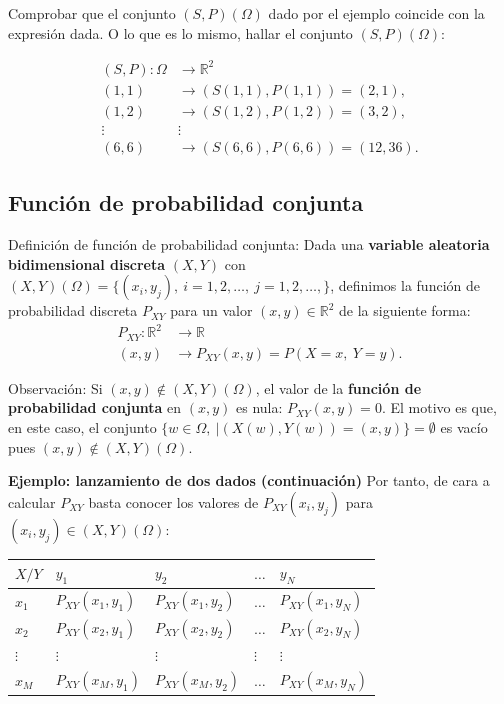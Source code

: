 \documentclass[]{book}
\begin{document}
Comprobar que el conjunto \((S,P)(\Omega)\) dado por el ejemplo coincide con la expresión dada.
O lo que es lo mismo, hallar el conjunto \((S,P)(\Omega)\):

\[
\begin{array}{rl}
(S,P): \Omega & \longrightarrow \mathbb{R}^2\\
(1,1) & \longrightarrow (S(1,1),P(1,1))=(2,1),\\
(1,2) & \longrightarrow (S(1,2),P(1,2))=(3,2),\\
\vdots & \vdots \\
(6,6) & \longrightarrow (S(6,6),P(6,6))=(12,36).
\end{array}
\]

\hypertarget{funciuxf3n-de-probabilidad-conjunta}{%
\subsection{Función de probabilidad conjunta}\label{funciuxf3n-de-probabilidad-conjunta}}

Definición de función de probabilidad conjunta:
Dada una \textbf{variable aleatoria bidimensional discreta} \((X,Y)\) con \((X,Y)(\Omega)=\{(x_i,y_j),\ i=1,2,\ldots,\ j=1,2,\ldots,\}\), definimos la función de probabilidad discreta \(P_{XY}\) para un valor \((x,y)\in\mathbb{R}^2\) de la siguiente forma:
\[
\begin{array}{rl}
P_{XY}: \mathbb{R}^2 & \longrightarrow \mathbb{R}\\
(x,y) & \longrightarrow P_{XY}(x,y)=P(X= x,\ Y= y).
\end{array}
\]

Observación:
Si \((x,y)\not\in (X,Y)(\Omega)\), el valor de la \textbf{función de probabilidad conjunta} en \((x,y)\) es nula: \(P_{XY}(x,y)=0\). El motivo es que, en este caso, el conjunto \(\{w\in\Omega,\ | (X(w),Y(w))=(x,y)\}=\emptyset\) es vacío pues \((x,y)\not\in (X,Y)(\Omega)\).

\textbf{Ejemplo: lanzamiento de dos dados (continuación)}
Por tanto, de cara a calcular \(P_{XY}\) basta conocer los valores de \(P_{XY}(x_i,y_j)\) para \((x_i,y_j)\in (X,Y)(\Omega)\):

\begin{longtable}[]{@{}lllll@{}}
\toprule
\(X/Y\) & \(y_1\) & \(y_2\) & \(\ldots\) & \(y_N\)\tabularnewline
\midrule
\endhead
\(x_1\) & \(P_{XY}(x_1,y_1)\) & \(P_{XY}(x_1,y_2)\) & \(\ldots\) & \(P_{XY}(x_1,y_N)\)\tabularnewline
\(x_2\) & \(P_{XY}(x_2,y_1)\) & \(P_{XY}(x_2,y_2)\) & \(\ldots\) & \(P_{XY}(x_2,y_N)\)\tabularnewline
\(\vdots\) & \(\vdots\) & \(\vdots\) & \(\vdots\) & \(\vdots\)\tabularnewline
\(x_M\) & \(P_{XY}(x_M,y_1)\) & \(P_{XY}(x_M,y_2)\) & \(\ldots\) & \(P_{XY}(x_M,y_N)\)\tabularnewline
\bottomrule
\end{longtable}
\end{document}
